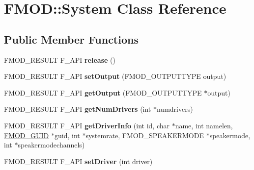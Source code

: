 \hypertarget{class_f_m_o_d_1_1_system}{\section{F\+M\+O\+D\+:\+:System Class Reference}
\label{class_f_m_o_d_1_1_system}
}
\subsection*{Public Member Functions}
\begin{DoxyCompactItemize}
\item 
\hypertarget{class_f_m_o_d_1_1_system_aa7ac27bd5b475d40b6ca4b3b93a9351d}{F\+M\+O\+D\+\_\+\+R\+E\+S\+U\+L\+T F\+\_\+\+A\+P\+I {\bfseries release} ()}\label{class_f_m_o_d_1_1_system_aa7ac27bd5b475d40b6ca4b3b93a9351d}

\item 
\hypertarget{class_f_m_o_d_1_1_system_a97cba04b9a36251e4443aaeba23f2d45}{F\+M\+O\+D\+\_\+\+R\+E\+S\+U\+L\+T F\+\_\+\+A\+P\+I {\bfseries set\+Output} (F\+M\+O\+D\+\_\+\+O\+U\+T\+P\+U\+T\+T\+Y\+P\+E output)}\label{class_f_m_o_d_1_1_system_a97cba04b9a36251e4443aaeba23f2d45}

\item 
\hypertarget{class_f_m_o_d_1_1_system_a3abd8e368b7b220b761fd885ba150485}{F\+M\+O\+D\+\_\+\+R\+E\+S\+U\+L\+T F\+\_\+\+A\+P\+I {\bfseries get\+Output} (F\+M\+O\+D\+\_\+\+O\+U\+T\+P\+U\+T\+T\+Y\+P\+E $\ast$output)}\label{class_f_m_o_d_1_1_system_a3abd8e368b7b220b761fd885ba150485}

\item 
\hypertarget{class_f_m_o_d_1_1_system_aabd75260613afffc7ef0650ac62ef2f4}{F\+M\+O\+D\+\_\+\+R\+E\+S\+U\+L\+T F\+\_\+\+A\+P\+I {\bfseries get\+Num\+Drivers} (int $\ast$numdrivers)}\label{class_f_m_o_d_1_1_system_aabd75260613afffc7ef0650ac62ef2f4}

\item 
\hypertarget{class_f_m_o_d_1_1_system_ac3e42c5e184343d930850b4894112eb9}{F\+M\+O\+D\+\_\+\+R\+E\+S\+U\+L\+T F\+\_\+\+A\+P\+I {\bfseries get\+Driver\+Info} (int id, char $\ast$name, int namelen, \hyperlink{struct_f_m_o_d___g_u_i_d}{F\+M\+O\+D\+\_\+\+G\+U\+I\+D} $\ast$guid, int $\ast$systemrate, F\+M\+O\+D\+\_\+\+S\+P\+E\+A\+K\+E\+R\+M\+O\+D\+E $\ast$speakermode, int $\ast$speakermodechannels)}\label{class_f_m_o_d_1_1_system_ac3e42c5e184343d930850b4894112eb9}

\item 
\hypertarget{class_f_m_o_d_1_1_system_a2ce18295f0e062054e1f8b9421788683}{F\+M\+O\+D\+\_\+\+R\+E\+S\+U\+L\+T F\+\_\+\+A\+P\+I {\bfseries set\+Driver} (int driver)}\label{class_f_m_o_d_1_1_system_a2ce18295f0e062054e1f8b9421788683}


\end{DoxyCompactItemize}
